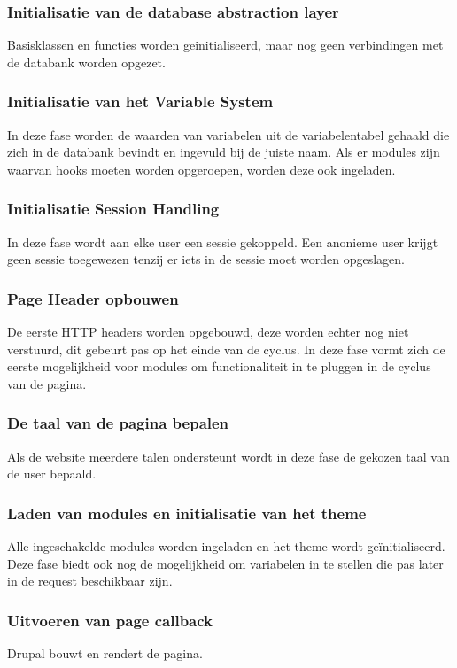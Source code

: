 \subsubsection{Initialisatie van de database abstraction layer}
Basisklassen en functies worden geinitialiseerd, maar nog geen verbindingen met de databank worden opgezet.

\subsubsection{Initialisatie van het Variable System}
In deze fase worden de waarden van variabelen uit de variabelentabel gehaald die zich in de databank bevindt en ingevuld bij de juiste naam. Als er modules zijn waarvan hooks moeten worden opgeroepen, worden deze ook ingeladen.

\subsubsection{Initialisatie Session Handling}
In deze fase wordt aan elke user een sessie gekoppeld. Een anonieme user krijgt geen sessie toegewezen tenzij er iets in de sessie moet worden opgeslagen.

\subsubsection{Page Header opbouwen}
De eerste HTTP headers worden opgebouwd, deze worden echter nog niet verstuurd, dit gebeurt pas op het einde van de cyclus. In deze fase vormt zich de eerste mogelijkheid voor modules om functionaliteit in te pluggen in de cyclus van de pagina.

\subsubsection{De taal van de pagina bepalen}
Als de website meerdere talen ondersteunt wordt in deze fase de gekozen taal van de user bepaald.

\subsubsection{Laden van modules en initialisatie van het theme}
Alle ingeschakelde modules worden ingeladen en het theme wordt ge\"{i}nitialiseerd. Deze fase biedt ook nog de mogelijkheid om variabelen in te stellen die pas later in de request beschikbaar zijn.

\subsubsection{Uitvoeren van page callback}
Drupal bouwt en rendert de pagina.

